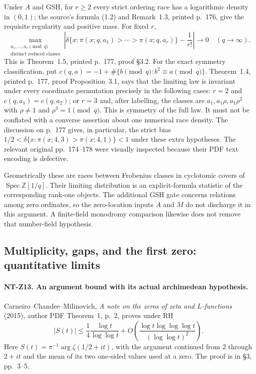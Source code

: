 \documentclass[11pt,a4paper]{article}
\begin{document}
Under $A$ and GSH, for $r\ge2$ every strict ordering race has a
logarithmic density in $(0,1)$; the source's formula (1.2) and
Remark~1.3, printed p.~176, give the requisite regularity and positive
mass.  For fixed $r$,
\[
 \max_{\substack{a_1,\ldots,a_r\pmod q\\
                   \text{distinct reduced classes}}}
 \left|\delta\{x:\pi(x;q,a_1)>\cdots>\pi(x;q,a_r)\}
                   -\frac1{r!}\right|\longrightarrow0
       \quad(q\to\infty).
\tag{NT-R04}
\]
This is Theorem~1.5, printed p.~177, proof \S3.2.
For the exact symmetry classification, put
$c(q,a)=-1+\#\{b\pmod q:b^2\equiv a\pmod q\}$.
Theorem~1.4, printed p.~177, proof Proposition~3.1, says that the
limiting law is invariant under every coordinate permutation precisely
in the following cases: $r=2$ and $c(q,a_1)=c(q,a_2)$; or $r=3$
and, after labelling, the classes are
$a_1,a_1\rho,a_1\rho^2$ with $\rho\ne1$ and $\rho^3=1\pmod q$.
This is symmetry of the full law.  It must not be conflated with a
converse assertion about one numerical race density.  The discussion
on p.~177 gives, in particular, the strict bias
$1/2<\delta\{x:\pi(x;4,3)>\pi(x;4,1)\}<1$ under these extra
hypotheses.  The relevant original pp.~174--178 were visually inspected
because their PDF text encoding is defective.

Geometrically these are races between Frobenius classes in cyclotomic
covers of $\operatorname{Spec}\mathbb Z[1/q]$.  Their limiting
distribution is an explicit-formula statistic of the corresponding
rank-one objects.  The additional GSH gate concerns relations among
zero ordinates, so the zero-location inputs $A$ and $M$ do not discharge
it in this argument.  A finite-field monodromy comparison likewise
does not remove that number-field hypothesis.

\subsection{Multiplicity, gaps, and the first zero: quantitative limits}

\paragraph{NT-Z13. An argument bound with its actual archimedean hypothesis.}
Carneiro--Chandee--Milinovich, \emph{A note on the zeros of zeta and
$L$-functions} (2015), author PDF Theorem~1, p.~2, proves under RH
\[
 |S(t)|\le \frac14\frac{\log t}{\log\log t}
       +O\left(\frac{\log t\log\log\log t}{(\log\log t)^2}\right).
\tag{NT-Z13a}
\]
Here $S(t)=\pi^{-1}\arg\zeta(1/2+it)$, with the argument continued
from $2$ through $2+it$ and the mean of its two one-sided values used
at a zero.  The proof is in \S3, pp.~3--5.
\end{document}

